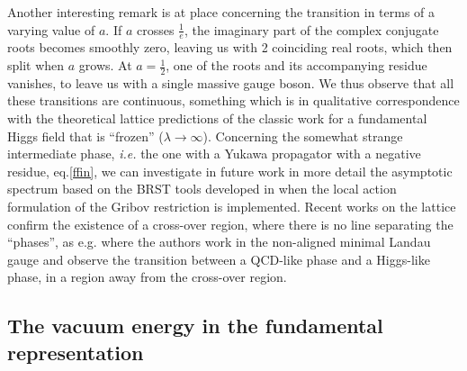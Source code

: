 Another interesting remark is at place concerning the transition in terms of a varying value of $a$. If $a$ crosses $\frac{1}{e}$, the imaginary part of the complex conjugate roots becomes smoothly zero, leaving us with 2 coinciding real roots, which then split when $a$ grows. At $a=\frac{1}{2}$, one of the roots and its accompanying residue vanishes, to leave us with a single massive gauge boson. We thus observe that all these transitions are continuous, something which is in qualitative correspondence with the theoretical lattice predictions of the classic work \cite{Fradkin:1978dv} for a fundamental Higgs field that is ``frozen'' ($\lambda\to\infty$). Concerning the somewhat strange intermediate phase, {\it i.e.}  the one with a Yukawa propagator with a negative residue, eq.\eqref{ffin}, we can investigate in future work in more detail the asymptotic spectrum based on the BRST tools developed in \cite{Dudal:2012sb} when the local action formulation of the Gribov restriction is implemented. Recent works on the lattice confirm the existence of a cross-over region, where there is no line separating the ``phases'', as e.g. \cite{Maas:2013aia,Maas:2014pba} where the authors work in the non-aligned minimal Landau gauge and observe the transition between a QCD-like phase and a Higgs-like phase, in a region away from the cross-over region.













\subsection{The vacuum energy in the fundamental representation}


